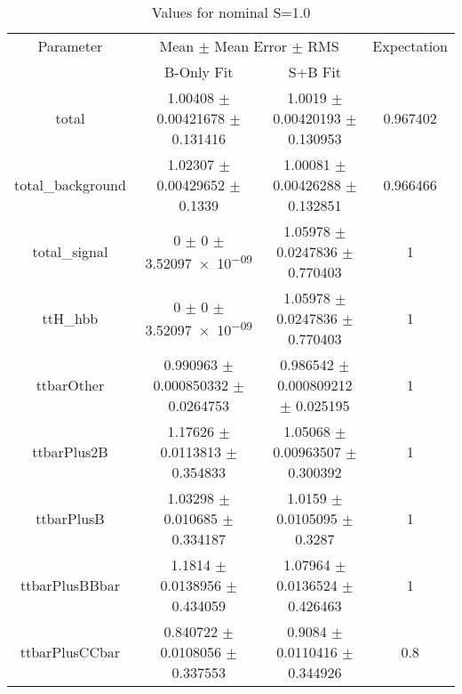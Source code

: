 \begin{table}
\centering
\caption{Values for nominal S=1.0}
\begin{tabular}{cccc}
\toprule
Parameter & \multicolumn{2}{c}{Mean $\pm$ Mean Error $\pm$ RMS} & Expectation\\
 & B-Only Fit & S+B Fit & \\
\midrule
total & \num{1.00408} $\pm$ \num{0.00421678} $\pm$ \num{0.131416} & \num{1.0019} $\pm$ \num{0.00420193} $\pm$ \num{0.130953} & \num{0.967402}\\
total\_background & \num{1.02307} $\pm$ \num{0.00429652} $\pm$ \num{0.1339} & \num{1.00081} $\pm$ \num{0.00426288} $\pm$ \num{0.132851} & \num{0.966466}\\
total\_signal & \num{0} $\pm$ \num{0} $\pm$ \num{3.52097e-09} & \num{1.05978} $\pm$ \num{0.0247836} $\pm$ \num{0.770403} & \num{1}\\
ttH\_hbb & \num{0} $\pm$ \num{0} $\pm$ \num{3.52097e-09} & \num{1.05978} $\pm$ \num{0.0247836} $\pm$ \num{0.770403} & \num{1}\\
ttbarOther & \num{0.990963} $\pm$ \num{0.000850332} $\pm$ \num{0.0264753} & \num{0.986542} $\pm$ \num{0.000809212} $\pm$ \num{0.025195} & \num{1}\\
ttbarPlus2B & \num{1.17626} $\pm$ \num{0.0113813} $\pm$ \num{0.354833} & \num{1.05068} $\pm$ \num{0.00963507} $\pm$ \num{0.300392} & \num{1}\\
ttbarPlusB & \num{1.03298} $\pm$ \num{0.010685} $\pm$ \num{0.334187} & \num{1.0159} $\pm$ \num{0.0105095} $\pm$ \num{0.3287} & \num{1}\\
ttbarPlusBBbar & \num{1.1814} $\pm$ \num{0.0138956} $\pm$ \num{0.434059} & \num{1.07964} $\pm$ \num{0.0136524} $\pm$ \num{0.426463} & \num{1}\\
ttbarPlusCCbar & \num{0.840722} $\pm$ \num{0.0108056} $\pm$ \num{0.337553} & \num{0.9084} $\pm$ \num{0.0110416} $\pm$ \num{0.344926} & \num{0.8}\\
\bottomrule
\end{tabular}
\end{table}
